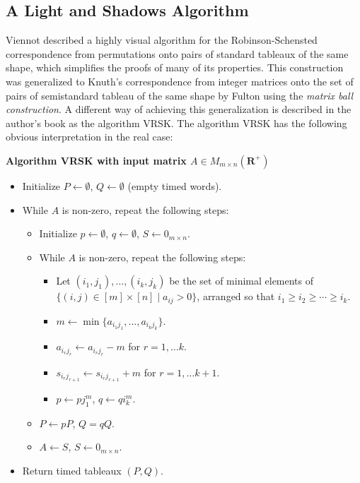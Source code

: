 \documentclass[12pt]{amsart}
\theoremstyle{definition}
\newcommand{\RR}{\mathbf R}
\newcommand{\ot}{\leftarrow}
\begin{document}
\subsection{A Light and Shadows Algorithm}
\label{sec:light-shad-algor}
Viennot \cite{viennot1977forme} described a highly visual algorithm for the Robinson-Schensted correspondence from permutations onto pairs of standard tableaux of the same shape, which simplifies the proofs of many of its properties.
This construction was generalized to Knuth's correspondence from integer matrices onto the set of pairs of semistandard tableau of the same shape by Fulton using the \emph{matrix ball construction}.
A different way of achieving this generalization is described in the author's book \cite{rtcv} as the algorithm VRSK.
The algorithm VRSK has the following obvious interpretation in the real case:

\begin{center}
  \textbf{Algorithm VRSK with input matrix $A\in M_{m\times n}(\RR^+)$}
\end{center}
\begin{itemize}
\item Initialize $P\ot \emptyset$, $Q\ot \emptyset$ (empty timed words).
\item While $A$ is non-zero, repeat the following steps:
  \begin{itemize}
  \item Initialize $p\ot\emptyset$, $q\ot \emptyset$, $S \ot 0_{m\times n}$.
  \item While $A$ is non-zero, repeat the following steps:
    \begin{itemize}
    \item Let $(i_1,j_1),\dotsc, (i_k,j_k)$ be the set of minimal elements of $\{(i,j)\in [m]\times [n]\mid a_{ij}>0\}$, arranged so that $i_1\geq i_2\geq \dotsb \geq i_k$.
    \item $m\ot\min\{a_{i_1j_1},\dotsc, a_{i_kj_k}\}$.
    \item $a_{i_rj_r}\ot a_{i_rj_r}-m$ for $r=1,\dotsc k$.
    \item $s_{i_rj_{r+1}}\ot s_{i_rj_{r+1}}+m$ for $r=1,\dotsc k+1$.
    \item $p\ot pj_1^m$, $q\ot qi_k^m$.
    \end{itemize}
  \item $P\ot pP$, $Q=qQ$.
  \item $A\ot S$, $S\ot 0_{m\times n}$.
  \end{itemize}
\item Return timed tableaux $(P,Q)$.
\end{itemize}
\end{document}
